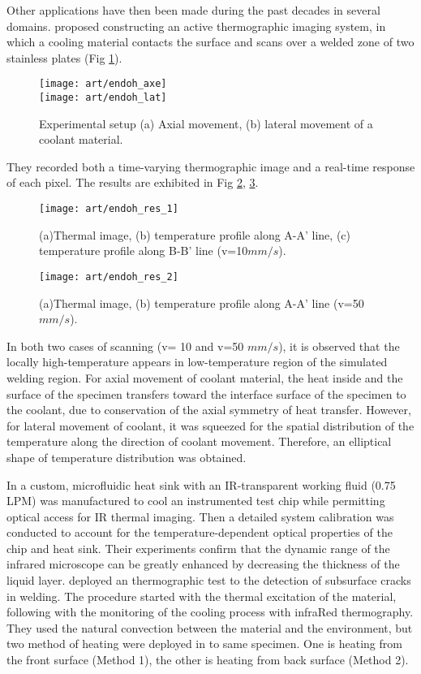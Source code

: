Other applications have then been made during the past decades in several domains. \citep{endohdynamical2012} proposed constructing an active thermographic imaging system, in which a cooling material contacts the surface and scans over a welded zone of two stainless plates (Fig \ref{endoh_fig}).
\begin{figure}[!htbp]
	\centering
	\texttt{[image: art/endoh\_axe]}\\
	\texttt{[image: art/endoh\_lat]}
	\caption{ Experimental setup (a) Axial movement, (b) lateral movement of a coolant material.}
	\label{endoh_fig}
\end{figure}
They recorded both a time-varying thermographic image and a real-time response of each pixel. The results are exhibited in Fig \ref{endoh_res_1}, \ref{endoh_res_2}.
\begin{figure}[!htbp]
	\centering
	\texttt{[image: art/endoh\_res\_1]}
	\caption{(a)Thermal image, (b) temperature profile along A-A’ line, (c) temperature profile along B-B’ line (v=10$mm/s$).}
	\label{endoh_res_1}
\end{figure}
\begin{figure}[!htbp]
	\centering
	\texttt{[image: art/endoh\_res\_2]}
	\caption{(a)Thermal image, (b) temperature profile along A-A’ line (v=50$ mm/s$).}
	\label{endoh_res_2}
\end{figure}

In both two cases of scanning (v= 10 and v=50 $mm/s$), it is observed that the locally high-temperature appears in low-temperature region of the simulated welding region. For axial movement of coolant material, the heat inside and the surface of the specimen transfers toward the interface surface of the specimen to the coolant, due to conservation of the axial symmetry of heat transfer. However, for lateral movement of coolant, it was squeezed for the spatial distribution of the temperature along the direction of coolant movement. Therefore, an elliptical shape of temperature distribution was obtained.

In \citep{2012-LewisHom} a custom, microfluidic  heat  sink  with  an  IR-transparent working  fluid  (0.75  LPM)  was  manufactured  to  cool  an instrumented test chip while permitting optical access for IR thermal imaging.  Then a detailed system calibration was conducted to account for the temperature-dependent optical properties of the chip and heat sink. Their experiments  confirm  that  the  dynamic  range  of  the infrared  microscope  can  be  greatly  enhanced  by decreasing the  thickness  of  the  liquid  layer. \citep{rodriguez2014cooling} deployed an thermographic test to the detection of subsurface cracks in welding. The procedure started with the thermal excitation of the material, following with the monitoring of the cooling process with infraRed thermography. They used the natural convection between the material and the environment, but two method of heating were deployed in to same specimen. One is heating from the front surface (Method 1), the other is heating from back surface (Method 2). 

